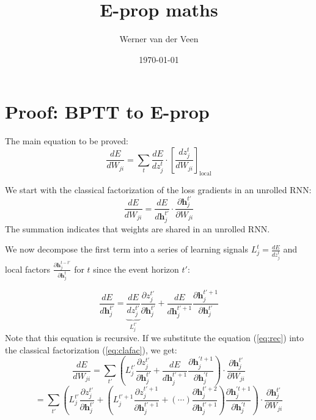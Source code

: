 \documentclass{article}
\title{E-prop maths}
\author{Werner van der Veen}
\date{\today}
\begin{document}
\maketitle

\section{Proof: BPTT to E-prop}
The main equation to be proved:
\begin{equation}
\frac{dE}{dW_{ji}} = 
\sum_t\frac{dE}{dz_j^t}\cdot\left[\frac{dz_j^t}{dW_{ji}}\right]_\text{local}
\end{equation}

We start with the classical factorization of the loss gradients in an unrolled RNN:
\begin{equation}\label{eq:clafac}
\frac{dE}{dW_{ji}} = \frac{dE}{d\mathbf{h}_j^{t'}}\cdot\frac{\partial \mathbf{h}_j^{t'}}{\partial W_{ji}}
\end{equation}
The summation indicates that weights are shared in an unrolled RNN.

We now decompose the first term into a series of learning signals $L_j^t = \frac{dE}{dz_j^t}$ and local factors $\frac{\partial\mathbf{h}_j^{t-t'}}{\partial\mathbf{h}_j^t}$ for $t$ since the event horizon $t'$:

\begin{equation}\label{eq:rec}
\frac{dE}{d\mathbf{h}_j^{t'}} = \underbrace{\frac{dE}{dz_j^{t'}}}_{L^{t'}_j} \frac{\partial z_j^{t'}}{\partial\mathbf{h}_j^{t'}} + \frac{dE}{d\mathbf{h}_j^{t'+1}}\frac{\partial\mathbf{h}_j^{t'+1}}{\partial\mathbf{h}_j^{t'}}
\end{equation}
Note that this equation is recursive.
If we substitute the equation (\ref{eq:rec}) into the classical factorization (\ref{eq:clafac}), we get:
\begin{equation}
\frac{dE}{dW_{ji}} = \sum_{t'}\left(L_j^{t'}\frac{\partial z_j^{t'}}{\partial\mathbf{h}_j^{t'}} + \frac{dE}{d\mathbf{h}_j^{t'+1}}\frac{\partial\mathbf{h}_j^{'t+1}}{\partial\mathbf{h}_j^{'t}}\right)\cdot\frac{\partial\mathbf{h}_j^{t'}}{\partial W_{ji}}
\end{equation}
\begin{equation}
= \sum_{t'}\left(L_j^{t'}\frac{\partial z_j^{t'}}{\partial\mathbf{h}_j^{t'}} + \left( L^{t'+1}_j \frac{\partial z_j^{t'+1}}{\partial\mathbf{h}_j^{t'+1}} + (\cdots)\frac{\partial\mathbf{h}_j^{t'+2}}{\partial\mathbf{h}_j^{t'+1}}  \right) \frac{\partial\mathbf{h}_j^{'t+1}}{\partial\mathbf{h}_j^{'t}}\right)\cdot\frac{\partial\mathbf{h}_j^{t'}}{\partial W_{ji}}
\end{equation}
\end{document}
